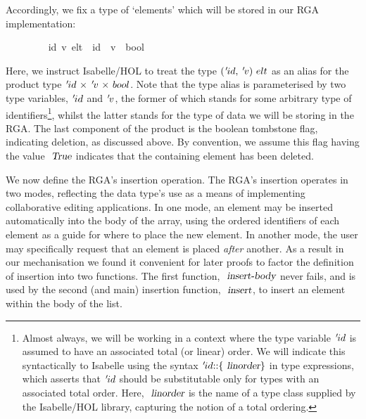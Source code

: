 \documentclass[acmlarge,review,anonymous]{acmart}\settopmatter{printfolios=true}
\begin{document}
Accordingly, we fix a type of `elements' which will be stored in our RGA implementation:
\\
\begin{isabellebody}
\ \ \ \ \ \ \ \  {\isacharparenleft}{\isacharprime}id{\isacharcomma}\ {\isacharprime}v{\isacharparenright}\ elt\ {\isacharequal}\ {\isachardoublequoteopen}{\isacharprime}id\ {\isasymtimes}\ {\isacharprime}v\ {\isasymtimes}\ bool{\isachardoublequoteclose}%
\end{isabellebody}
\vspace{\baselineskip}
Here, we instruct Isabelle/HOL to treat the type ${\isacharparenleft}{\isacharprime}id{\isacharcomma}\ {\isacharprime}v{\isacharparenright}\ elt$ as an alias for the product type ${\isacharprime}id\ {\isasymtimes}\ {\isacharprime}v\ {\isasymtimes}\ bool$.
Note that the type alias is parameterised by two type variables, ${\emph{$\mskip2mu{'}\mskip-2mu$}}id$ and ${\emph{$\mskip2mu{'}\mskip-2mu$}}v$, the former of which stands for some arbitrary type of identifiers\footnote{Almost always, we will be working in a context where the type variable ${\emph{$\mskip2mu{'}\mskip-2mu$}}id$ is assumed to have an associated total (or linear) order.
We will indicate this syntactically to Isabelle using the syntax ${\isacharprime}id{\isacharcolon}{\isacharcolon}{\isacharbraceleft}\isa{linorder}{\isacharbraceright}$ in type expressions, which asserts that ${\emph{$\mskip2mu{'}\mskip-2mu$}}id$ should be substitutable only for types with an associated total order.
Here, $\isa{linorder}$ is the name of a type class supplied by the Isabelle/HOL library, capturing the notion of a total ordering.}, whilst the latter stands for the type of data we will be storing in the RGA.
The last component of the product is the boolean tombstone flag, indicating deletion, as discussed above.
By convention, we assume this flag having the value $\isa{True}$ indicates that the containing element has been deleted.

We now define the RGA's insertion operation.
The RGA's insertion operates in two modes, reflecting the data type's use as a means of implementing collaborative editing applications.
In one mode, an element may be inserted automatically into the body of the array, using the ordered identifiers of each element as a guide for where to place the new element.
In another mode, the user may specifically request that an element is placed \emph{after} another.
As a result in our mechanisation we found it convenient for later proofs to factor the definition of insertion into two functions.
The first function, $\isa{insert-body}$ never fails, and is used by the second (and main) insertion function, $\isa{insert}$, to insert an element within the body of the list.
\end{document}

